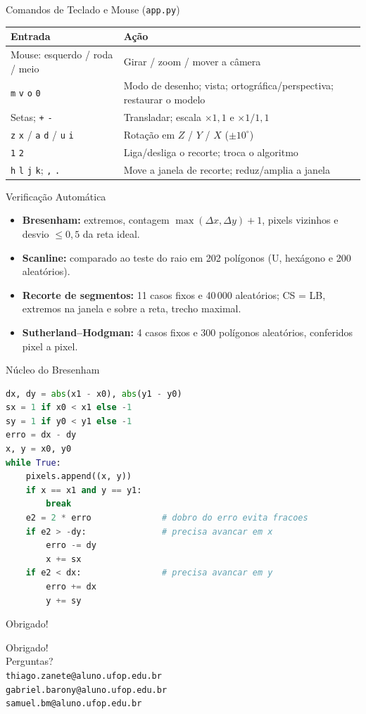 \documentclass[aspectratio=169,11pt]{beamer}
\begin{document}
\begin{frame}{Comandos de Teclado e Mouse (\texttt{app.py})}
\footnotesize
\begin{tabularx}{\textwidth}{l X}
\toprule
\textbf{Entrada} & \textbf{Ação}\\
\midrule
Mouse: esquerdo / roda / meio & Girar / zoom / mover a câmera\\
\texttt{m} \texttt{v} \texttt{o} \texttt{0} & Modo de desenho; vista; ortográfica/perspectiva; restaurar o modelo\\
Setas; \texttt{+} \texttt{-} & Transladar; escala $\times1{,}1$ e $\times1/1{,}1$\\
\texttt{z} \texttt{x} / \texttt{a} \texttt{d} / \texttt{u} \texttt{i} & Rotação em $Z$ / $Y$ / $X$ ($\pm10^{\circ}$)\\
\texttt{1} \texttt{2} & Liga/desliga o recorte; troca o algoritmo\\
\texttt{h} \texttt{l} \texttt{j} \texttt{k}; \texttt{,} \texttt{.} & Move a janela de recorte; reduz/amplia a janela\\
\bottomrule
\end{tabularx}
\end{frame}

\begin{frame}{Verificação Automática}
\small
\begin{itemize}
  \item \textbf{Bresenham:} extremos, contagem $\max(\Delta x,\Delta y)+1$, pixels vizinhos e desvio $\le0{,}5$ da reta ideal.
  \item \textbf{Scanline:} comparado ao teste do raio em 202 polígonos (U, hexágono e 200 aleatórios).
  \item \textbf{Recorte de segmentos:} 11 casos fixos e 40\,000 aleatórios; CS = LB, extremos na janela e sobre a reta, trecho maximal.
  \item \textbf{Sutherland--Hodgman:} 4 casos fixos e 300 polígonos aleatórios, conferidos pixel a pixel.
\end{itemize}
\end{frame}

\begin{frame}[fragile]{Núcleo do Bresenham}
\begin{lstlisting}[language=Python]
dx, dy = abs(x1 - x0), abs(y1 - y0)
sx = 1 if x0 < x1 else -1
sy = 1 if y0 < y1 else -1
erro = dx - dy
x, y = x0, y0
while True:
    pixels.append((x, y))
    if x == x1 and y == y1:
        break
    e2 = 2 * erro              # dobro do erro evita fracoes
    if e2 > -dy:               # precisa avancar em x
        erro -= dy
        x += sx
    if e2 < dx:                # precisa avancar em y
        erro += dx
        y += sy
\end{lstlisting}
\end{frame}

\begin{frame}{Obrigado!}
\begin{center}
{\Huge Obrigado!}\\[0.5cm]
{\large Perguntas?}\\[0.5cm]
{\small \texttt{thiago.zanete@aluno.ufop.edu.br}\\ \texttt{gabriel.barony@aluno.ufop.edu.br}\\ \texttt{samuel.bm@aluno.ufop.edu.br}}
\end{center}
\end{frame}
\end{document}
